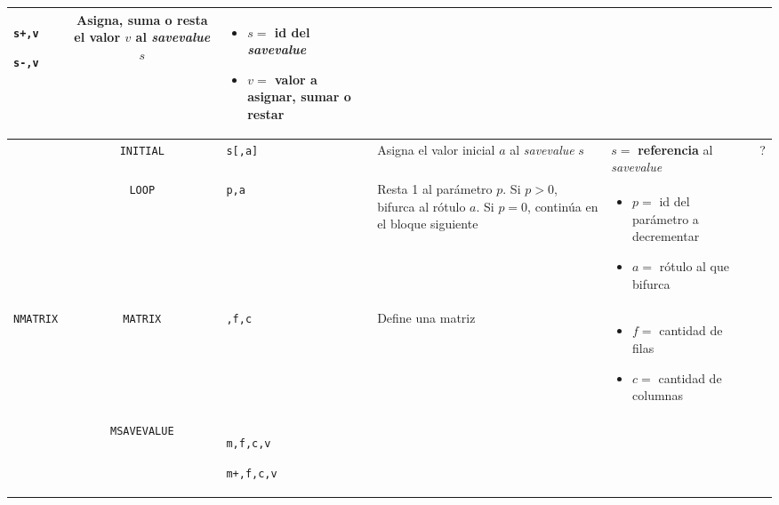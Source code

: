 \documentclass[12pt, a4paper, twoside]{paquetes-apunte/apunte}
\providecommand{\tabularnewline}{\\}
\begin{document}
\begin{longtable}{|lc>{\raggedright}p{3cm}|>{\raggedright}p{5cm}|>{\raggedright}p{7cm}|>{\raggedright}p{4cm}|}
\texttt{s+,v}

\texttt{s-,v} & Asigna, suma o resta el valor $v$ al \emph{savevalue} $s$ & \begin{itemize}
\item $s=$ id del \emph{savevalue}
\item $v=$ valor a asignar, sumar o restar\end{itemize}
 & \tabularnewline
\hline 
 & \texttt{INITIAL} & \texttt{s{[},a{]}} & Asigna el valor inicial $a$ al \emph{savevalue} $s$ & $s=$ \textbf{referencia} al \emph{savevalue} & ?\tabularnewline
\hline 
 & \texttt{LOOP} & \texttt{p,a} & Resta 1 al parámetro $p$. Si $p>0$, bifurca al rótulo $a$. Si $p=0$,
continúa en el bloque siguiente & \begin{itemize}
\item $p=$ id del parámetro a decrementar
\item $a=$ rótulo al que bifurca\end{itemize}
 & \tabularnewline
\hline 
\texttt{NMATRIX} & \texttt{MATRIX} & \texttt{,f,c} & Define una matriz & \begin{itemize}
\item $f=$ cantidad de filas
\item $c=$ cantidad de columnas\end{itemize}
 & \tabularnewline
\hline 
 & \texttt{MSAVEVALUE} & \texttt{m,f,c,v}

\texttt{m+,f,c,v}


\end{longtable}
\end{document}
